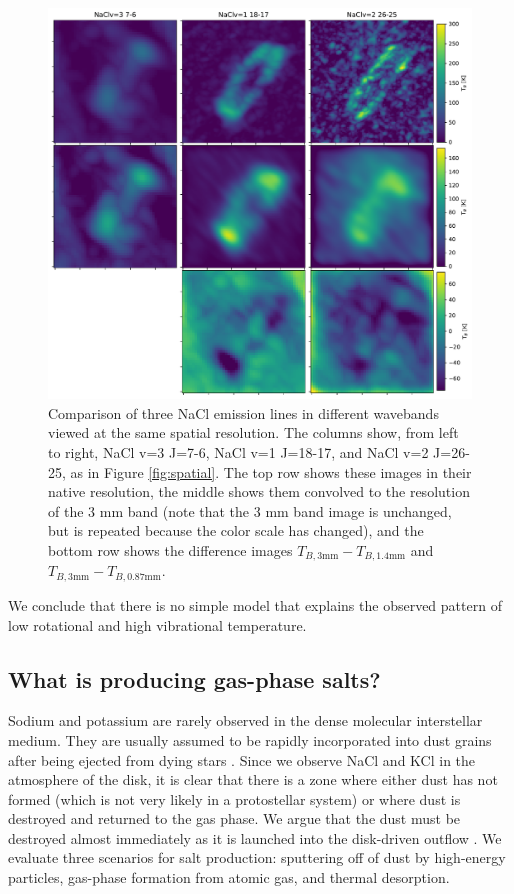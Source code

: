 \documentclass[twocolumn]{aastex62}
\begin{document}
\begin{figure}[!htp]
\includegraphics[scale=1,width=7in]{figures/resolution_comparison_nacl_peaks.pdf}
\caption{Comparison of three NaCl emission lines in different wavebands viewed
at the same spatial resolution.  The columns show, from left to right, NaCl v=3
J=7-6, NaCl v=1 J=18-17, and NaCl v=2 J=26-25, as in Figure \ref{fig:spatial}.
The top row shows these images in their native resolution, the middle shows
them convolved to the resolution of the 3 mm band (note that the 3 mm band
image is unchanged, but is repeated because the color scale has changed), and
the bottom row shows the difference images $T_{B,3 \mathrm{mm}} - T_{B, 1.4
\mathrm{mm}}$ and $T_{B,3 \mathrm{mm}} - T_{B, 0.87 \mathrm{mm}}$.  }

\label{fig:resolutioncomparison}
\end{figure}


\bigskip

We conclude that there is no simple model that explains the observed pattern of
low rotational and high vibrational temperature.



\subsection{What is producing gas-phase salts?}

Sodium and potassium are rarely observed in the dense molecular interstellar
medium.  They are usually assumed to be rapidly incorporated into dust grains
after being ejected from dying stars \citep[e.g.,][]{Milam2007a}.  Since we
observe NaCl and KCl in the atmosphere of the disk, it is clear that
there is a zone where either dust has not  formed  (which is not very likely
in a protostellar system)
or
where dust is destroyed and returned to the gas phase.  We argue that the dust
must be destroyed almost immediately as it is launched into the disk-driven
outflow \citep{Hirota2017b}. We evaluate three scenarios for salt production:
sputtering off of dust by high-energy particles, gas-phase formation from
atomic gas, and thermal desorption.
\end{document}
